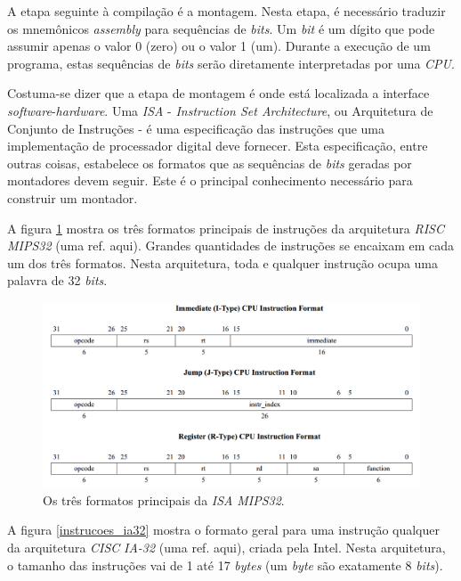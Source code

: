 A etapa seguinte à compilação é a montagem. Nesta etapa, é necessário traduzir
os mnemônicos \textit{assembly} para sequências de \textit{bits}. Um
\textit{bit} é um dígito que pode assumir apenas o valor 0 (zero) ou o valor 1
(um). Durante a execução de um programa, estas sequências de \textit{bits} serão
diretamente interpretadas por uma \textit{CPU}.

Costuma-se dizer que a etapa de montagem é onde está localizada a interface
\textit{software}-\textit{hardware}. Uma \textit{ISA} - \textit{Instruction Set
Architecture}, ou Arquitetura de Conjunto de Instruções - é uma especificação
das instruções que uma implementação de processador digital deve fornecer. Esta
especificação, entre outras coisas, estabelece os formatos que as sequências de
\textit{bits} geradas por montadores devem seguir. Este é o principal
conhecimento necessário para construir um montador.

A figura \ref{instrucoes_mips} mostra os três formatos principais de instruções
da arquitetura \textit{RISC} \textit{MIPS32} (uma ref. aqui). Grandes
quantidades de instruções se encaixam em cada um dos três formatos. Nesta
arquitetura, toda e qualquer instrução ocupa uma palavra de 32 \textit{bits}.

\begin{figure}[ptb]
  \begin{center}
    \includegraphics[scale=.35]{imagens/instrucoes_mips}
  \end{center}
  \caption{Os três formatos principais da \textit{ISA} \textit{MIPS32}.}
  \label{instrucoes_mips}
\end{figure}

A figura \ref{instrucoes_ia32} mostra o formato geral para uma instrução
qualquer da arquitetura \textit{CISC} \textit{IA-32} (uma ref. aqui), criada
pela Intel. Nesta arquitetura, o tamanho das instruções vai de 1 até 17
\textit{bytes} (um \textit{byte} são exatamente 8 \textit{bits}).

